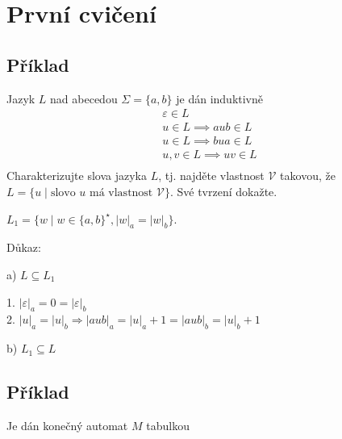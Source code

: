 \section{První cvičení}

\subsection{Příklad}
Jazyk $L$ nad abecedou $\Sigma = \{a,b\}$ je dán induktivně
\begin{gather*}
    \varepsilon \in L \\
    u \in L \implies aub \in L\\
    u \in L \implies bua \in L\\
    u, v \in L \implies uv \in L\\
\end{gather*}
Charakterizujte slova jazyka $L$, tj. najděte vlastnost $\mathcal{V}$ takovou, že $L = \{u \mid \text{slovo } u 
\text{ má vlastnost } \mathcal{V}\}$. Své tvrzení dokažte.

$L_1 = \{w \mid w \in \{a,b\}^\star, |w|_a=|w|_b\}$.

\noindent
Důkaz:
\begin{multicols}{2}
\noindent
a) $L \subseteq L_1$

1. $|\varepsilon|_a = 0 = |\varepsilon|_b$\\
2. $|u|_a = |u|_b \Rightarrow |aub|_a = |u|_a + 1 = |aub|_b = |u|_b + 1$

\columnbreak

b) $L_1 \subseteq L$
\end{multicols}


\newpage
\subsection{Příklad}
Je dán konečný automat $M$ tabulkou



